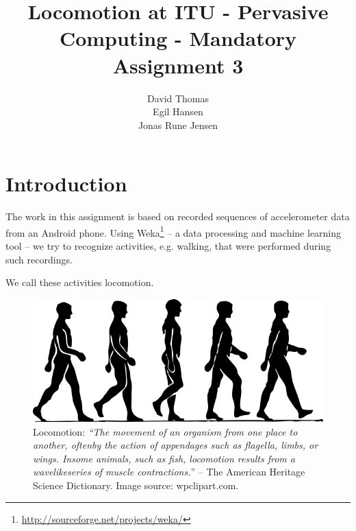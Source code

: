 \documentclass{ubicomp2012}
\begin{document}
\setlength{\paperheight}{11in}
\setlength{\paperwidth}{8.5in}
\setlength{\pdfpageheight}{\paperheight}
\setlength{\pdfpagewidth}{\paperwidth}

\toappear{}

\title{Locomotion at ITU - Pervasive Computing - Mandatory Assignment 3}
\author{
  \alignauthor David Thomas\\
 \alignauthor Egil Hansen\\
 \alignauthor Jonas Rune Jensen\\
}

\maketitle

\section{Introduction}

The work in this assignment is based on recorded sequences of accelerometer data from an Android phone. Using Weka\footnote{\url{http://sourceforge.net/projects/weka/}} -- a data processing and machine learning tool -- we try to recognize activities, e.g. walking, that were performed during such recordings.

We call these activities locomotion.

\begin{figure}[thr]
\begin{center}
\includegraphics[width=0.90\columnwidth]{figures/human_locomotion.png}
\end{center}
\caption{Locomotion: \textit{``The movement of an organism from one place to another, oftenby the action of appendages such as flagella, limbs, or wings. Insome animals, such as fish, locomotion results from a wavelikeseries of muscle contractions.}'' -- The American Heritage Science Dictionary. Image source: wpclipart.com.}
\end{figure}
\end{document}
